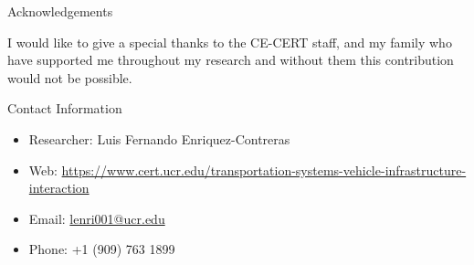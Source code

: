 \documentclass[final, 20 pt]{beamer}
\newlength{\onecolwid}
\begin{document}
\begin{frame}[t]
\begin{columns}[t]
\begin{column}{\onecolwid}

\begin{block}{Acknowledgements}

I would like to give a special thanks to the CE-CERT staff, and my family who have supported me throughout my research and without them this contribution would not be possible. \\

\end{block}




\begin{alertblock}{Contact Information}
	
	\begin{itemize}
		\item Researcher: Luis Fernando Enriquez-Contreras
		\item Web: \href{https://www.cert.ucr.edu/transportation-systems-vehicle-infrastructure-interaction}{https://www.cert.ucr.edu/transportation-systems-vehicle-infrastructure-interaction}
		\item Email: \href{lenri001@ucr.edu}{lenri001@ucr.edu}
		\item Phone: +1 (909) 763 1899
	\end{itemize}
	
\end{alertblock}

\begin{center}
	\begin{tabular}{ccc}
	\end{tabular}
\end{center}

\end{column} %

\end{columns} %

\end{frame} %
\end{document}

